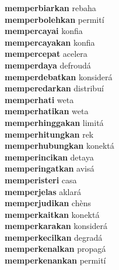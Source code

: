 \textbf{memperbiarkan } rebaha \\
\textbf{memperbolehkan } permití \\
\textbf{mempercayai } konfia \\
\textbf{mempercayakan } konfia \\
\textbf{mempercepat } acelera \\
\textbf{memperdaya } defroudá \\
\textbf{memperdebatkan } konsiderá \\
\textbf{memperedarkan } distribuí \\
\textbf{memperhati } weta \\
\textbf{memperhatikan } weta \\
\textbf{memperhinggakan } limitá \\
\textbf{memperhitungkan } rek \\
\textbf{memperhubungkan } konektá \\
\textbf{memperincikan } detaya \\
\textbf{memperingatkan } avisá \\
\textbf{memperisteri } casa \\
\textbf{memperjelas } aklará \\
\textbf{memperjudikan } chèns \\
\textbf{memperkaitkan } konektá \\
\textbf{memperkarakan } konsiderá \\
\textbf{memperkecilkan } degradá \\
\textbf{memperkenalkan } propagá \\
\textbf{memperkenankan } permití \\
